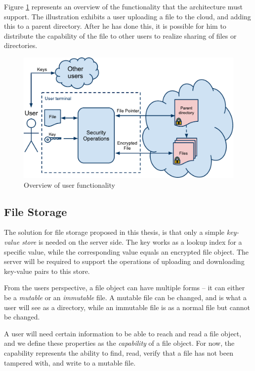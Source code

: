\documentclass[pdftex,english,10pt,b5paper,twoside]{book}
\begin{document}
Figure \ref{fig:AS:overview} represents an overview of the functionality that
the architecture must support. The illustration exhibits a user uploading a
file to the cloud, and adding this to a parent directory. After he has done
this, it is possible for him to distribute the capability of the file to other
users to realize sharing of files or directories.

\begin{figure}[h!]
    \centering
    \includegraphics[width=\columnwidth]{ArchitectureOverview.pdf}
    \caption{Overview of user functionality}
    \label{fig:AS:overview}
\end{figure}

\subsection{File Storage}
\label{sec:AS:FS}

The solution for file storage proposed in this thesis, is that only a simple
\emph{key-value store} is needed on the server side. The key works as a lookup
index for a specific value, while the corresponding value equals an encrypted
file object. The server will be required to support the operations of uploading
and downloading key-value pairs to this store.

From the users perspective, a file object can have multiple forms -- it can
either be a \emph{mutable} or an \emph{immutable} file. A mutable file can be
changed, and is what a user will see as a directory, while an immutable file is
as a normal file but cannot be changed.

A user will need certain information to be able to reach and read a file
object, and we define these properties as the \emph{capability} of a file
object.  For now, the capability represents the ability to find, read, verify
that a file has not been tampered with, and write to a mutable file.
\end{document}
